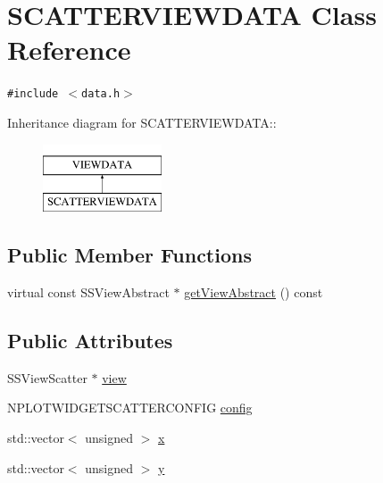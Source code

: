 \hypertarget{class_s_c_a_t_t_e_r_v_i_e_w_d_a_t_a}{
\section{SCATTERVIEWDATA Class Reference}
\label{class_s_c_a_t_t_e_r_v_i_e_w_d_a_t_a}
}
{\tt \#include $<$data.h$>$}

Inheritance diagram for SCATTERVIEWDATA::\begin{figure}[H]
\begin{center}
\leavevmode
\includegraphics[height=2cm]{class_s_c_a_t_t_e_r_v_i_e_w_d_a_t_a}
\end{center}
\end{figure}
\subsection*{Public Member Functions}
\begin{CompactItemize}
\item 
virtual const SSViewAbstract $\ast$ \hyperlink{class_s_c_a_t_t_e_r_v_i_e_w_d_a_t_a_afd6be79567be97348e6c98094e00596}{getViewAbstract} () const 
\end{CompactItemize}
\subsection*{Public Attributes}
\begin{CompactItemize}
\item 
SSViewScatter $\ast$ \hyperlink{class_s_c_a_t_t_e_r_v_i_e_w_d_a_t_a_856bee6d011d630e10fdb5429cb0a2b0}{view}
\item 
NPLOTWIDGETSCATTERCONFIG \hyperlink{class_s_c_a_t_t_e_r_v_i_e_w_d_a_t_a_bcc7e15480842b30a29e8cddef6812e9}{config}
\item 
std::vector$<$ unsigned $>$ \hyperlink{class_s_c_a_t_t_e_r_v_i_e_w_d_a_t_a_4fc4bda1633e9e58b3d2317a16a01f82}{x}
\item 
std::vector$<$ unsigned $>$ \hyperlink{class_s_c_a_t_t_e_r_v_i_e_w_d_a_t_a_fef898485048afd11c4f1d4ceff274af}{y}
\end{CompactItemize}


